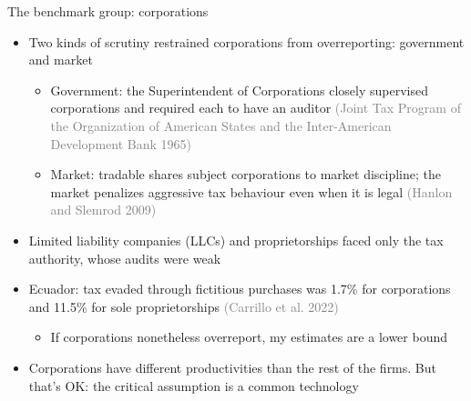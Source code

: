 \documentclass[
  ignorenonframetext,
  aspectratio=169,
]{beamer}
\newcounter{none} %
\providecommand{\tightlist}{%
  \setlength{\itemsep}{0pt}\setlength{\parskip}{0pt}}
\newcommand{\sm}[1]{\textcolor{gray}{\footnotesize #1}} %
\begin{document}
\begin{frame}{The benchmark group: corporations}
\protect{}\label{the-benchmark-group-corporations}
\begin{itemize}
\tightlist
\item
  Two kinds of scrutiny restrained corporations from overreporting:
  government and market

  \begin{itemize}
  \tightlist
  \item
    Government: the Superintendent of Corporations closely supervised
    corporations and required each to have an auditor \sm{(Joint Tax
    Program of the Organization of American States and the
    Inter-American Development Bank 1965)}
  \item
    Market: tradable shares subject corporations to market discipline;
    the market penalizes aggressive tax behaviour even when it is legal
    \sm{(Hanlon and Slemrod 2009)}
  \end{itemize}
\item
  Limited liability companies (LLCs) and proprietorships faced only the
  tax authority, whose audits were weak
\item
  Ecuador: tax evaded through fictitious purchases was 1.7\% for
  corporations and 11.5\% for sole proprietorships \sm{(Carrillo et al.
  2022)}

  \begin{itemize}
  \tightlist
  \item
    If corporations nonetheless overreport, my estimates are a lower
    bound
  \end{itemize}
\item
  Corporations have different productivities than the rest of the firms.
  But that's OK: the critical assumption is a common technology
\end{itemize}
\end{frame}
\end{document}
